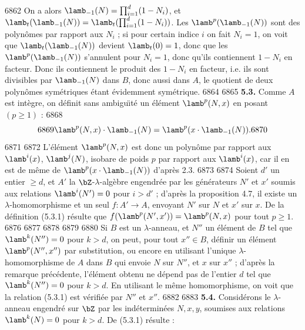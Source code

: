   6862		On a alors $\lamb_{-1}(N) = \prod_{i=1}^{d}(1 - N_i)$, et $\lamb_t(\lamb_{-1}(N)) = \lamb_t(\prod_{i=1}^{d}(1 - N_i))$. Les $\lamb^p(\lamb_{-1}(N))$ sont des polyn\^omes par rapport aux $N_i$ ; si pour certain indice $i$ on fait $N_i = 1$, on voit que $\lamb_t(\lamb_{-1}(N))$ devient $\lamb_t(0) = 1$, donc que les $\lamb^p(\lamb_{-1}(N))$ s'annulent pour $N_i = 1$, donc qu'ils contiennent $1 - N_i$ en facteur. Donc ils contiennent le produit des $1 - N_i$ en facteur, i.e. ils sont divisibles par $\lamb_{-1}(N)$ dans $B$, donc aussi dans $A$, le quotient de deux polyn\^omes sym\'etriques \'etant \'evidemment sym\'etrique.
  6864	
  6865			\noindent\textbf{5.3.} Comme $A$ est int\`egre, on d\'efinit sans ambigu\"{\i}t\'e un \'el\'ement $\lamb^p(N,x)$ en posant $(p \geq 1)$ :
  6868	\begin{equation}
  6869	\lamb^p(N,x) \cdot \lamb_{-1}(N) = \lamb^p(x \cdot \lamb_{-1}(N)).
  6870	\end{equation}
  6871	
  6872	L'\'el\'ement $\lamb^p(N,x)$ est donc un polyn\^ome par rapport aux $\lamb^i(x)$, $\lamb^j(N)$, isobare de poids $p$ par rapport aux $\lamb^i(x)$, car il en est de m\^eme de $\lamb^p(x \cdot \lamb_{-1}(N))$ d'apr\`es 2.3.
  6873	
  6874		Soient $d'$ un entier $\geq d$, et $A'$ la $\bZ$-$\lambda$-alg\`ebre engendr\'ee par les g\'en\'erateurs $N'$ et $x'$ soumis aux relations $\lamb^i(N') = 0$ pour $i > d'$ ; d'apr\`es la proposition 4.7, il existe un $\lambda$-homomorphisme et un seul $f : A' \to A$, envoyant $N'$ sur $N$ et $x'$ sur $x$. De la d\'efinition (5.3.1) r\'esulte que $f(\lamb^p(N',x')) = \lamb^p(N,x)$ pour tout $p \geq 1$.
  6876	
  6877	%
  6878	%
  6879	%
  6880		Si $B$ est un $\lambda$-anneau, et $N''$ un \'el\'ement de $B$ tel que $\lamb^k(N'') = 0$ pour $k > d$, on peut, pour tout $x'' \in B$, d\'efinir un \'el\'ement $\lamb^p(N'',x'')$ par substitution, ou encore en utilisant l'unique $\lambda$-homomorphisme de $A$ dans $B$ qui envoie $N$ sur $N''$, et $x$ sur $x''$ ; d'apr\`es la remarque pr\'ec\'edente, l'\'el\'ement obtenu ne d\'epend pas de l'entier $d$ tel que $\lamb^k(N'') = 0$ pour $k > d$. En utilisant le m\^eme homomorphisme, on voit que la relation (5.3.1) est v\'erifi\'ee par $N''$ et $x''$.
  6882	
  6883		\noindent\textbf{5.4.} Consid\'erons le $\lambda$-anneau engendr\'e sur $\bZ$ par les ind\'etermin\'ees $N, x, y$, soumises aux relations $\lamb^k(N) = 0$ pour $k > d$. De (5.3.1) r\'esulte :

